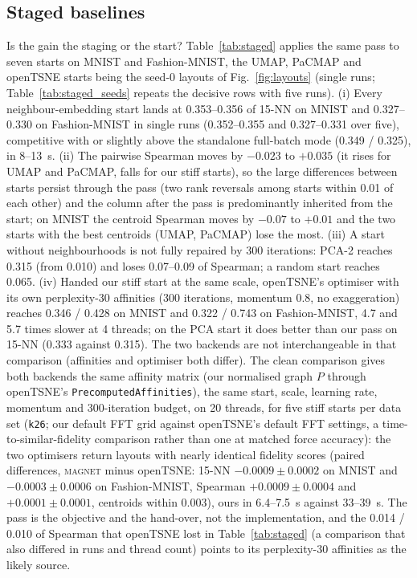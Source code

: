 \documentclass[11pt]{article}
\newcommand{\magnet}{\textsc{magnet}}
\begin{document}
\subsection{Staged baselines}\label{sec:stagedbase}
Is the gain the staging or the start? Table~\ref{tab:staged} applies the same pass to seven starts on
MNIST and Fashion-MNIST, the UMAP, PaCMAP and openTSNE starts being the seed-0 layouts of
Fig.~\ref{fig:layouts} (single runs; Table~\ref{tab:staged_seeds} repeats the decisive rows with five
runs). (i) Every neighbour-embedding start lands at 0.353--0.356 of 15-NN on MNIST and 0.327--0.330 on
Fashion-MNIST in single runs (0.352--0.355 and 0.327--0.331 over five), competitive with or slightly
above the standalone full-batch mode (0.349 / 0.325), in 8--13~s. (ii) The pairwise Spearman moves by
$-0.023$ to $+0.035$ (it rises for UMAP and PaCMAP, falls for our stiff starts), so the large
differences between starts persist through the pass (two rank reversals among starts within 0.01 of
each other) and the column after the pass is predominantly inherited from the start; on MNIST the
centroid Spearman moves by $-0.07$ to $+0.01$ and the two starts with the best centroids (UMAP, PaCMAP)
lose the most. (iii) A start without neighbourhoods is
not fully repaired by 300 iterations: PCA-2 reaches 0.315 (from 0.010) and loses 0.07--0.09 of
Spearman; a random start reaches 0.065. (iv) Handed our stiff start at the same scale, openTSNE's
optimiser with its own perplexity-30 affinities (300 iterations, momentum 0.8, no exaggeration) reaches
0.346 / 0.428 on MNIST and 0.322 / 0.743 on Fashion-MNIST, 4.7 and 5.7 times slower at 4 threads; on
the PCA start it does better than our pass on 15-NN (0.333 against 0.315). The two backends are not
interchangeable in that comparison (affinities and optimiser both differ). The clean comparison gives
both backends the same affinity matrix (our normalised graph $P$ through openTSNE's
\texttt{PrecomputedAffinities}), the same start, scale, learning rate, momentum and 300-iteration
budget, on 20 threads, for five stiff starts per data set (\texttt{k26}; our default FFT grid against
openTSNE's default FFT settings, a time-to-similar-fidelity comparison rather than one at matched force
accuracy): the two optimisers return layouts with nearly identical fidelity scores (paired differences, \magnet{} minus openTSNE: 15-NN
$-0.0009 \pm 0.0002$ on MNIST and $-0.0003 \pm 0.0006$ on Fashion-MNIST, Spearman $+0.0009 \pm 0.0004$
and $+0.0001 \pm 0.0001$, centroids within 0.003), ours in 6.4--7.5~s against 33--39~s. The pass is the
objective and the hand-over, not the implementation, and the 0.014 / 0.010 of Spearman that openTSNE
lost in Table~\ref{tab:staged} (a comparison that also differed in runs and thread count) points to its
perplexity-30 affinities as the likely source.
\end{document}

